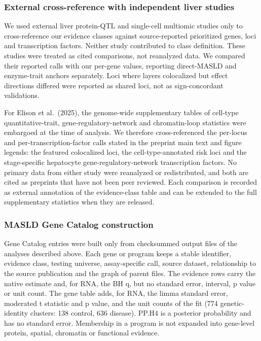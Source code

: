 \subsubsection{External cross-reference with independent liver studies}\label{external-cross-reference-with-independent-liver-studies}

We used external liver protein-QTL and single-cell multiomic studies only to cross-reference our evidence classes against source-reported prioritized genes, loci and transcription factors. Neither study contributed to class definition. These studies were treated as cited comparisons, not reanalyzed data. We compared their reported calls with our per-gene values, reporting direct-MASLD and enzyme-trait anchors separately. Loci where layers colocalized but effect directions differed were reported as shared loci, not as sign-concordant validations.

For Elison et al.~(2025), the genome-wide supplementary tables of cell-type quantitative-trait, gene-regulatory-network and chromatin-loop statistics were embargoed at the time of analysis. We therefore cross-referenced the per-locus and per-transcription-factor calls stated in the preprint main text and figure legends: the featured colocalized loci, the cell-type-annotated risk loci and the stage-specific hepatocyte gene-regulatory-network transcription factors. No primary data from either study were reanalyzed or redistributed, and both are cited as preprints that have not been peer reviewed. Each comparison is recorded as external annotation of the evidence-class table and can be extended to the full supplementary statistics when they are released.

\subsubsection{MASLD Gene Catalog construction}\label{masld-gene-catalog-construction}

Gene Catalog entries were built only from checksummed output files of the analyses described above. Each gene or program keeps a stable identifier, evidence class, testing universe, assay-specific call, source dataset, relationship to the source publication and the graph of parent files. The evidence rows carry the native estimate and, for RNA, the BH q, but no standard error, interval, p value or unit count. The gene table adds, for RNA, the limma standard error, moderated t statistic and p value, and the unit counts of the fit (774 genetic-identity clusters: 138 control, 636 disease). PP.H4 is a posterior probability and has no standard error. Membership in a program is not expanded into gene-level protein, spatial, chromatin or functional evidence.

